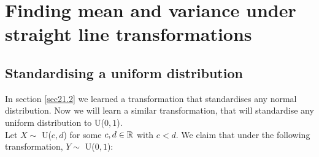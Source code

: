 	\hfil{}
	\bigskip
	\bigskip
	
\section{Finding mean and variance under straight line transformations} \label{meanvarUniform}
\subsection{Standardising a uniform distribution}
In section \ref{sec21.2} we learned a transformation that standardises any normal distribution. Now we will learn a similar transformation, that will standardise any uniform distribution to U($0,1$). \\

\noindent Let $X \sim$ U($c,d$) for some $c,d \in \mathbb{R}$ with $c < d$. We claim that under the following transformation, $Y \sim$ U($0,1$):

  	\bigskip
	
	\hfil{}
	\bigskip
	\bigskip
	
